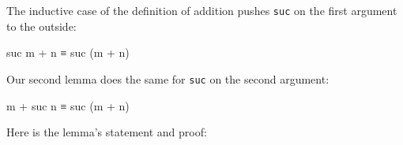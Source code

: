 The inductive case of the definition of addition pushes \texttt{suc} on
the first argument to the outside:

\begin{myDisplay}
suc m + n ≡ suc (m + n)
\end{myDisplay}

Our second lemma does the same for \texttt{suc} on the second argument:

\begin{myDisplay}
m + suc n ≡ suc (m + n)
\end{myDisplay}

Here is the lemma's statement and proof:

\begin{fence}
\begin{code}%
\>[0]\AgdaSpace{}%
\AgdaSymbol{:}\AgdaSpace{}%
\AgdaSpace{}%
\AgdaSymbol{(}\AgdaSpace{}%
\AgdaSpace{}%
\AgdaSymbol{:}\AgdaSpace{}%
\AgdaSymbol{)}\AgdaSpace{}%
\AgdaSpace{}%
\AgdaSpace{}%
\AgdaOperator{\AgdaPrimitive{+}}\AgdaSpace{}%
\AgdaSpace{}%
\AgdaSpace{}%
\AgdaSpace{}%
\AgdaSpace{}%
\AgdaSymbol{(}\AgdaSpace{}%
\AgdaOperator{\AgdaPrimitive{+}}\AgdaSpace{}%
\AgdaSymbol{)}\<%
\\
\>[0]\AgdaSpace{}%
\AgdaSpace{}%
\AgdaSpace{}%
\AgdaSymbol{=}\<%
\\
\>[0][@{}l@{\AgdaIndent{0}}]%
\>[2]\<%
\\
\>[2][@{}l@{\AgdaIndent{0}}]%
\>[4]\AgdaSpace{}%
\AgdaOperator{\AgdaPrimitive{+}}\AgdaSpace{}%
\AgdaSpace{}%
\<%
\\
%
\>[2]\<%
\\
\>[2][@{}l@{\AgdaIndent{0}}]%
\>[4]\AgdaSpace{}%
\<%
\\
%
\>[2]\<%
\\
\>[2][@{}l@{\AgdaIndent{0}}]%
\>[4]\AgdaSpace{}%
\AgdaSymbol{(}\AgdaSpace{}%
\AgdaOperator{\AgdaPrimitive{+}}\AgdaSpace{}%
\AgdaSymbol{)}\<%
\\
%
\>[2]\<%
\\

\end{code}
\end{fence}
